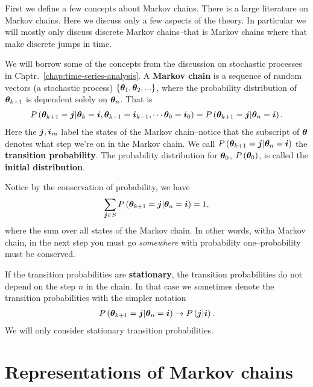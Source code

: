 
First we define a few concepts about Markov chains.
There is a large literature on Markov chains. 
Here we discuss only a few aspects of the theory. 
In particular we will mostly only discuss discrete Markov chains--that is Markov chains where that make discrete jumps in time.

We will borrow some of the concepts from the discussion on stochastic processes in Chptr.~\ref{chap:time-series-analysis}.
A \textbf{Markov chain} is a sequence of random vectors (a stochastic process) $\left\{{\bm \theta}_1,{\bm \theta}_2,...\right\}$, where the probability distribution of ${\bm \theta}_{k+1}$ is dependent solely on ${\bm \theta}_n$.
That is 
\begin{align}
    P\left({\bm \theta}_{k+1}={\bm j}|{\bm \theta}_{k}={\bm i}, {\bm \theta}_{k-1} = {\bm i}_{k-1}, \cdots {\bm \theta}_{0} = {\bm i}_0\right) 
     =
     P\left({\bm \theta}_{k+1}={\bm j}|{\bm \theta}_n={\bm i}\right)
     .
\end{align}
Here the ${\bm j},{\bm i}_m$ label the states of the Markov chain--notice that the subscript of ${\bm \theta}$ denotes what step we're on in the Markov chain. 
We call $P\left({\bm \theta}_{k+1}={\bm j}|{\bm \theta}_n={\bm i}\right)$ the \textbf{transition probability}. 
The probability distribution for ${\bm \theta}_0$, $P\left({\bm \theta}_0\right)$, is called the \textbf{initial distribution}.

Notice by the conservation of probability, we have
\begin{align}
    \label{eq:conservation-of-probability}
    \sum_{{\bm j}\in S}P\left({\bm \theta}_{k+1}={\bm j}|{\bm \theta}_n={\bm i}\right)
    =
    1
    ,
\end{align}
where the sum over all states of the Markov chain.
In other words, witha Markov chain, in the next step you must go \emph{somewhere} with probability one--probability must be conserved.


If the transition probabilities are \textbf{stationary}, the transition probabilities do not depend on the step $n$ in the chain.
In that case we sometimes denote the transition probabilities with the simpler notation 
\begin{align}
     P\left({\bm \theta}_{k+1}={\bm j}|{\bm \theta}_n={\bm i}\right)
     \to
     P\left({\bm j}|{\bm i}\right)
    .
\end{align}
We will only consider stationary transition probabilities.
\section{Representations of Markov chains\label{sec:representations-markov-chains}}

